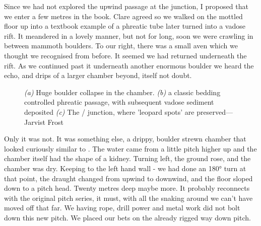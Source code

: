 Since we had not explored the upwind passage at the junction, I proposed that we enter a few metres in the book. Clare agreed so we walked on the mottled floor up into a textbook example of a phreatic tube later turned into a vadose rift. It meandered in a lovely manner, but not for long, soon we were crawling in between mammoth boulders. To our right, there was a small aven which we thought we recognised from before. It seemed we had returned underneath the  rift. As we continued past it underneath another enormous boulder we heard the echo, and drips of a larger chamber beyond,  itself not doubt.





\begin{figure}[t!]
\checkoddpage \ifoddpage \forcerectofloat \else \forceversofloat \fi
\centering
    \begin{subfigure}[t]{0.353\textwidth}
        \centering
        
        \caption{} \label{traverse over buckwheat}
    \end{subfigure}
        \hfill
\begin{subfigure}[t]{0.63\textwidth}
\centering
{}
 \caption{}\label{passage in Deja VU}
\end{subfigure}
    \vspace{0cm}
    \begin{subfigure}[t]{\textwidth}
    \centering
       
        \caption{} \label{Deja vu}
    \end{subfigure}
    \caption{
    \textit{(a)} Huge boulder collapse in the \protect{} chamber.  
     \textit{(b)} \protect{} a classic bedding controlled phreatic passage, with subsequent vadose sediment deposited
     \textit{(c)} The  \protect{}/ \protect{} junction, where 'leopard spots' are preserved--- Jarvist Frost }
\end{figure}


Only it was not. It was something else, a drippy, boulder strewn chamber that looked curiously similar to . The water came from a little pitch higher up and the chamber itself had the shape of a kidney. Turning left, the ground rose, and the chamber was dry. Keeping to the left hand wall - we had done an 180° turn at that point, the draught changed from upwind to downwind, and the floor sloped down to a pitch head. Twenty metres deep maybe more. It probably reconnects with the original pitch series, it must, with all the snaking around we can’t have moved off that far. We having rope, drill power and metal work did not bolt down this new pitch. We placed our bets on the already rigged way down  pitch. 

